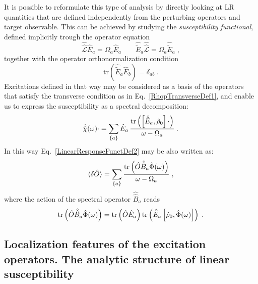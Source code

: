 \documentclass[reprint,aps,prb]{revtex4-1}
\newcommand{\be}{\begin{equation}}
\newcommand{\ee}{\end{equation}}
\newcommand{\nn}{\notag}
\newcommand{\qq}{\qquad}
\newcommand{\lb}{\label}
\newcommand{\op}[1]{\hat {#1}}
\newcommand{\sop}[1]{\op{\op {#1}}}
\newcommand{\commutator}[2]{\left[ {#1} , {#2} \right]}
\newcommand{\trace}[1]{\mathrm{tr}\left(#1\right)}
\newcommand{\dmnot}{\op{\rho}_0}
\newcommand{\Liouv}{\sop{\mathcal L}}
\begin{document}
It is possible to reformulate this type of analysis by directly looking at LR quantities that are defined independently from the perturbing operators and target observable. This can be achieved by studying the \emph{susceptibility functional}, defined implicitly trough the operator equation
\be\lb{ExcitationOperatorsDef1}
\Liouv \op E_a = \Omega_a \op E_a \qq \op{\tilde E}_a \Liouv = \Omega_a \op{\tilde E}_a \;,
\ee
together with the operator orthonormalization condition %
\be\lb{orthoExcitatioOpDef1}
\trace{\op{\tilde E}_a\op E_b} = \delta_{ab} \;.
\ee
Excitations defined in that way may be considered as a basis of the operators that satisfy the transverse condition as in
Eq.~\eqref{RhopTransverseDef1}, and enable us to express the susceptibility as a spectral decomposition:
\be\lb{RhopExcitationDef1}
\sop{{\cal \chi}}(\omega) \cdot   = \sum_{\{a\}} \op E_{a} \,
\frac{\trace{\commutator{\op{\tilde E}_a}{\dmnot}\cdot}}{\omega-\Omega_a} \;.
\ee
In this way Eq.~\eqref{LinearResponseFunctDef2} may be also written as:
\be\lb{deltaoexc}
  \braket{\delta \op O} =  \sum_{\{a\}} \frac{\trace{\op O \sop B_a \op \Phi(\omega)}}{\omega -\Omega_a}\;,
\ee
where the action of the spectral operator $\sop B_a$ reads
\be
  \trace{\op O \sop B_a \op \Phi(\omega)} = \trace{\op O \op E_a}
  \trace{\op{\tilde E}_a \commutator{\dmnot}{\op \Phi(\omega)}} \;. \nn
\ee

\subsection{Localization features of the excitation operators. The analytic structure of linear susceptibility}
\end{document}
